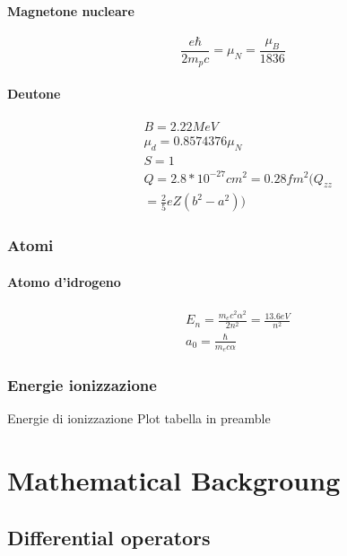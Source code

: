 \documentclass[main.tex]{subfiles}
\begin{document}
\subsection{Magnetone nucleare}
 
\begin{equation*}
\frac{e\hbar}{2m_pc}=\mu_N=\frac{\mu_B}{1836}
\end{equation*}
 
\subsection{Deutone}
 
\begin{align*}
&B=2.22 MeV\\
&\mu_d=0.8574376\mu_N\\
&S=1\\
&Q=2.8*10^{-27}cm^2=0.28fm^2(Q_{zz}\\
&=\frac{2}{5}eZ(b^2-a^2))
\end{align*}
 
\section{Atomi}

\subsection{Atomo d'idrogeno}

\begin{align*}
&E_n=\frac{m_ec^2\alpha^2}{2n^2}=\frac{13.6eV}{n^2}\\
&a_0=\frac{\hbar}{m_ec\alpha}
 \end{align*}

\section{Energie ionizzazione}
 
\begin{todo}{Energie di ionizzazione}
Plot tabella in preamble
\end{todo}

\part{Mathematical Backgroung}

\chapter{Differential operators}
\PartialToc
\end{document}
